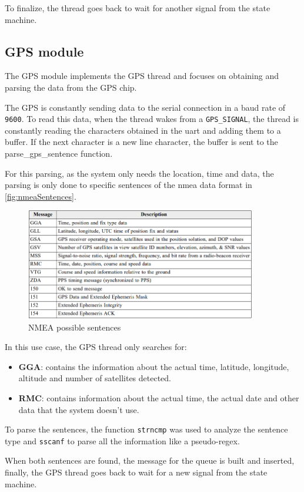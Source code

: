 To finalize, the thread goes back to wait for another signal from the state machine.
\clearpage
\subsection{GPS module}
The GPS module implements the GPS thread and focuses on obtaining and parsing the data from the GPS chip.

The GPS is constantly sending data to the serial connection in a baud rate of \texttt{9600}. To read this data, when the thread wakes from a \texttt{GPS\_SIGNAL}, the thread is constantly reading the characters obtained in the \acrshort{uart} and adding them to a 
buffer. If the next character is a new line character, the buffer is sent to the parse\_gps\_sentence function.

For this parsing, as the system only needs the location, time and data, the parsing is only done to specific sentences of the \acrshort{nmea} data format in \autoref{fig:nmeaSentences}.
\begin{figure}[H]
    \centering
    \includegraphics[width=0.9\textwidth]{images/4/nmea.png}
    \caption{NMEA possible sentences\cite{NMEAReferenceManual}}
    \label{fig:nmeaSentences}
\end{figure}
In this use case, the GPS thread only searches for:
\begin{itemize}
    \item \textbf{GGA}: contains the information about the actual time, latitude, longitude, altitude and number of satellites detected.
    \item \textbf{RMC}: contains information about the actual time, the actual date and other data that the system doesn't use.
\end{itemize}
To parse the sentences, the function \texttt{strncmp} was used to analyze the sentence type and \texttt{sscanf} to parse all the information like a pseudo-regex.

When both sentences are found, the message for the queue is built and inserted, finally, the GPS thread goes back to wait for a new signal from the state machine.


